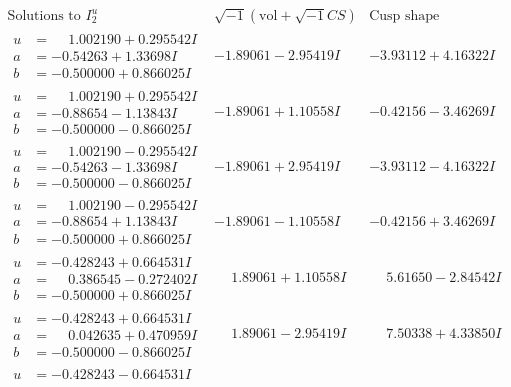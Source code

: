 \documentclass[1p]{elsarticle_modified}
\theoremstyle{definition}
\newcommand{\I}{\sqrt{-1}}
\begin{document}
$$\begin{array}{c|c|c}  
\text{Solutions to }I^u_{2}& \I (\text{vol} + \sqrt{-1}CS) & \text{Cusp shape}\\
 \hline 
\begin{aligned}
u &= \phantom{-}1.002190 + 0.295542 I \\
a &= -0.54263 + 1.33698 I \\
b &= -0.500000 + 0.866025 I\end{aligned}
 & -1.89061 - 2.95419 I & -3.93112 + 4.16322 I \\ \hline\begin{aligned}
u &= \phantom{-}1.002190 + 0.295542 I \\
a &= -0.88654 - 1.13843 I \\
b &= -0.500000 - 0.866025 I\end{aligned}
 & -1.89061 + 1.10558 I & -0.42156 - 3.46269 I \\ \hline\begin{aligned}
u &= \phantom{-}1.002190 - 0.295542 I \\
a &= -0.54263 - 1.33698 I \\
b &= -0.500000 - 0.866025 I\end{aligned}
 & -1.89061 + 2.95419 I & -3.93112 - 4.16322 I \\ \hline\begin{aligned}
u &= \phantom{-}1.002190 - 0.295542 I \\
a &= -0.88654 + 1.13843 I \\
b &= -0.500000 + 0.866025 I\end{aligned}
 & -1.89061 - 1.10558 I & -0.42156 + 3.46269 I \\ \hline\begin{aligned}
u &= -0.428243 + 0.664531 I \\
a &= \phantom{-}0.386545 - 0.272402 I \\
b &= -0.500000 + 0.866025 I\end{aligned}
 & \phantom{-}1.89061 + 1.10558 I & \phantom{-}5.61650 - 2.84542 I \\ \hline\begin{aligned}
u &= -0.428243 + 0.664531 I \\
a &= \phantom{-}0.042635 + 0.470959 I \\
b &= -0.500000 - 0.866025 I\end{aligned}
 & \phantom{-}1.89061 - 2.95419 I & \phantom{-}7.50338 + 4.33850 I \\ \hline\begin{aligned}
u &= -0.428243 - 0.664531 I \\

\end{aligned}
\end{array}$$
\end{document}

